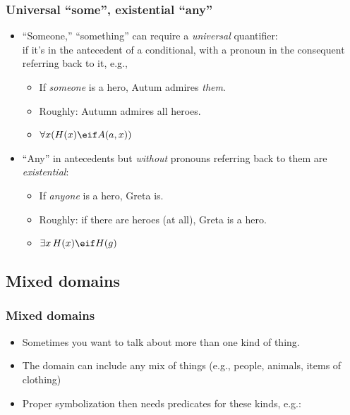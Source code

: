 \begin{frame}
\frametitle{Universal ``some'', existential ``any''}

\begin{itemize}[<+->]
  \item ``Someone,'' ``something'' can require a \emph{universal} quantifier:\\
 if it's in the antecedent of a conditional, with a pronoun in the consequent referring back to it, e.g.,
  \begin{itemize}[<+->]
    \item[] If \emph{someone} is a hero, Autum admires \emph{them}.
    \item[] Roughly: Autumn admires all heroes.
    \item[] \alert{$\forall x(H(x) \eif A(a, x))$}
  \end{itemize}
  \item ``Any'' in antecedents but \emph{without} pronouns referring back to
  them are \emph{existential}:
  \begin{itemize}[<+->]
    \item[] If \emph{anyone} is a hero, Greta is.
    \item[] Roughly: if there are heroes (at all), Greta is a hero.
    \item[] \alert{$\exists x\, H(x) \eif H(g)$}
  \end{itemize}
\end{itemize}
\end{frame}

\newhourlecture

\subsection{Mixed domains}

\begin{frame}
\frametitle{Mixed domains}

\begin{itemize}[<+->]
  \item Sometimes you want to talk about more than one kind of thing.
  \item The domain can include any mix of things (e.g., people,
  animals, items of clothing)
  \item Proper symbolization then needs predicates for these kinds, e.g.:
\end{itemize}
\end{frame}


